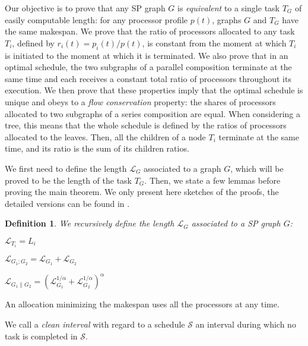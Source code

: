 \documentclass{llncs}
\newtheorem{defi}[theorem]{Definition}
\newcommand{\LG}[1]{\mathcal{L}_{#1}}
\newcommand{\para}[2]{#1 \mathop{\parallel} #2}
\newcommand{\seri}[2]{#1 \mathop{;} #2}
\newcommand{\s}{\mathcal S\xspace}
\newcommand{\rat}{r}
\newcommand{\fctofproc}{{processor profile}\xspace}
\begin{document}
Our objective is to prove that any SP graph $G$ is \emph{equivalent}
to a single task $T_G$ of easily computable length: for any \fctofproc
$p(t)$, graphs $G$ and $T_G$ have the same makespan. We prove that the
ratio of processors allocated to any task $T_i$, defined by
$\rat_i(t)= p_i(t)/p(t)$, is constant from the
moment at which $T_i$ is initiated to the moment at which it is
terminated. We also prove that in an optimal schedule, the two
subgraphs of a parallel composition terminate at the same
time and each receives a constant total ratio of processors throughout
its execution.
We then prove that these properties imply that the optimal schedule is unique and obeys
to a {\it flow conservation} property: the shares of processors
allocated to two subgraphs of a series composition are equal. When
considering a tree, this means that the whole schedule is defined by
the ratios of processors allocated to the leaves. Then, all the children of a node $T_i$ terminate at the
same time, and its ratio is the sum of its children
ratios.


We first need to define the length $\LG{G}$ associated to a graph $G$, which
will be proved to be the length of the task $T_G$. Then, we state a few lemmas
before proving the main theorem. We only present here sketches of the proofs,
the detailed versions can be found in \cite{RR-ipdps-2014}.

\begin{defi}
\label{def.eq-task}
We recursively define the length $\LG{G}$ associated to a SP graph $G$:
\begin{inparaitem}
	\item $\LG{T_i} = L_i$ \hfill 
	\item $\LG{\seri{G_1}{G_2}} = \LG{G_1} + \LG{G_2}$ \hfill
	\item $\LG{\para{G_1}{G_2}} = \left(\LG{G_1}^{1/\alpha} + \LG{G_2}^{1/\alpha}\right)^\alpha$
\end{inparaitem}
\end{defi}

\newcommand{\Q}{\mathcal{Q}}



\begin{lemma}
  \label{lem:allproc}
  An allocation minimizing the makespan uses all the processors at any time. 
\end{lemma}



We call a \emph{clean interval} with regard to a schedule $\s$ an
interval during which no task is completed in $\s$.
\end{document}
